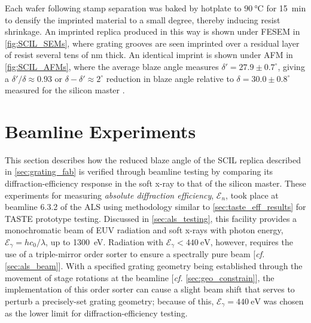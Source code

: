 Each wafer following stamp separation was baked by hotplate to $\SI{90}{\celsius}$ for \SI{15}{\minute} to densify the imprinted material to a small degree, thereby inducing resist shrinkage. 
An imprinted replica produced in this way is shown under FESEM in \cref{fig:SCIL_SEMs}, where grating grooves are seen imprinted over a residual layer of resist several tens of \si{\nm} thick. 
An identical imprint is shown under AFM in \cref{fig:SCIL_AFMs}, where the average blaze angle measures $\delta' = 27.9 \pm 0.7^{\circ}$, giving a $\delta' / \delta \approx 0.93$ or $\delta - \delta' \approx 2^{\circ}$ reduction in blaze angle relative to $\delta = 30.0 \pm 0.8^{\circ}$ measured for the silicon master \cite[\emph{cf.\@} \cref{sec:master_for_SCIL}]{McCoy20b}. 

\section{Beamline Experiments}\label{sec:beamline_testing}
This section describes how the reduced blaze angle of the SCIL replica described in \cref{sec:grating_fab} is verified through beamline testing by comparing its diffraction-efficiency response in the soft x-ray to that of the silicon master. 
These experiments for measuring \emph{absolute diffraction efficiency}, $\mathscr{E}_n$, took place at beamline 6.3.2 of the ALS \cite{ALS_632,Underwood96,Gullikson01} using methodology similar to \cref{sec:taste_eff_results} for TASTE prototype testing.  %
Discussed in \cref{sec:als_testing}, this facility provides a monochromatic beam of EUV radiation and soft x-rays with photon energy, $\mathcal{E}_{\gamma} = h c_0 / \lambda$, up to \SI{1300}{\electronvolt}. 
Radiation with $\mathcal{E}_{\gamma} < \SI{440}{\electronvolt}$, however, requires the use of a triple-mirror order sorter to ensure a spectrally pure beam [\emph{cf.\@} \cref{sec:als_beam}]. 
With a specified grating geometry being established through the movement of stage rotations at the beamline [\emph{cf.\@} \cref{sec:geo_constrain}], the implementation of this order sorter can cause a slight beam shift that serves to perturb a precisely-set grating geometry; because of this, $\mathcal{E}_{\gamma} = \SI{440}{\electronvolt}$ was chosen as the lower limit for diffraction-efficiency testing. 

